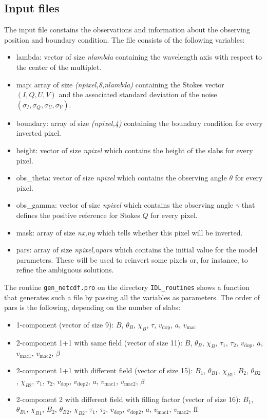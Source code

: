\documentclass[12pt]{article}
\begin{document}
\subsection{Input files}
The input file constains the
observations and information about the observing position and boundary condition. The file
consists of the following variables:
\begin{itemize}
\item lambda: vector of size \textit{nlambda} containing the wavelength axis with respect to the center of the multiplet.
\item map: array of size \textit{(npixel,8,nlambda)} containing the Stokes vector $(I,Q,U,V)$ and
the associated standard deviation of the noise $(\sigma_I,\sigma_Q,\sigma_U,\sigma_V)$.
\item boundary: array of size \textit{(npixel,4)} containing the boundary condition for every inverted pixel.
\item height: vector of size \textit{npixel} which contains the height of the slabs for every pixel.
\item obs\_theta: vector of size \textit{npixel} which contains the observing angle $\theta$ for every pixel.
\item obs\_gamma: vector of size \textit{npixel} which contains the observing angle $\gamma$ that defines the positive
reference for Stokes $Q$ for every pixel.
\item mask: array of size \textit{nx,ny} which tells whether this pixel will be inverted.
\item pars: array of size \textit{npixel,npars} which contains the initial value for the model parameters. These will be
used to reinvert some pixels or, for instance, to refine the ambiguous solutions.
\end{itemize}
The routine \texttt{gen\_netcdf.pro} on the directory \texttt{IDL\_routines} shows a function that
generates such a file by passing all the variables as parameters.
The order of pars is the following, depending on the number of slabs:
\begin{itemize}
\item 1-component (vector of size 9): $B$, $\theta_B$, $\chi_B$, $\tau$, $v_\mathrm{dop}$, $a$, $v_\mathrm{mac}$
\item 2-component 1+1 with same field (vector of size 11): $B$, $\theta_B$, $\chi_B$, $\tau_1$, $\tau_2$, $v_\mathrm{dop}$, $a$, $v_\mathrm{mac1}$, $v_\mathrm{mac2}$, $\beta$
\item 2-component 1+1 with different field (vector of size 15): $B_1$, $\theta_{B1}$, $\chi_{B1}$, $B_2$, $\theta_{B2}$, $\chi_{B2}$, $\tau_1$, $\tau_2$, $v_\mathrm{dop}$, $v_\mathrm{dop2}$, $a$, $v_\mathrm{mac1}$, $v_\mathrm{mac2}$, $\beta$
\item 2-component 2 with different field with filling factor (vector of size 16): $B_1$, $\theta_{B1}$, $\chi_{B1}$, $B_2$, $\theta_{B2}$, $\chi_{B2}$, $\tau_1$, $\tau_2$, $v_\mathrm{dop}$, $v_\mathrm{dop2}$, $a$, 
$v_\mathrm{mac1}$, $v_\mathrm{mac2}$, $\mathrm{ff}$
\end{itemize}
\end{document}
